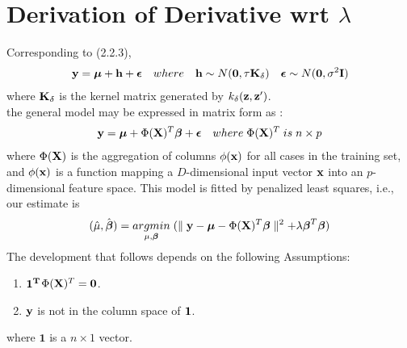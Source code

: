 \documentclass[11pt]{article}
\begin{document}
\section{{\bf Derivation of Derivative wrt $\lambda$}}
Corresponding to (2.2.3),
\begin{align*}
{\bf y}=\boldsymbol{\mu}+{\bf h}+\boldsymbol{\epsilon} \quad where \quad {\bf h} \sim N(\mathbf{0}, \tau {\bf K}_\delta) \quad \boldsymbol{\epsilon} \sim N(\mathbf{0}, \sigma^2{\bf I})
\end{align*}
where ${\bf K}_\delta$ is the kernel matrix generated by $k_{\delta}({\bf z}, {\bf z}')$.\\
the general model may be expressed in matrix form as \citep{reiss_smoothing_2009}:
\begin{align}
{\bf y}=\boldsymbol{\mu}+\Phi({\bf X})^T \boldsymbol{\beta}+\boldsymbol{\epsilon} \quad where\; \Phi({\bf X})^T \;is\; n\times p
\end{align}
where $\Phi({\bf X})$ is the aggregation of columns $\phi({\bf x})$ for all cases in the training set, and $\phi({\bf x})$ is a function mapping a $D$-dimensional input vector ${\bf x}$ into an $p$-dimensional feature space. This model is fitted by penalized least squares, i.e., our estimate is
\begin{align}
(\hat{\mu}, \hat{\boldsymbol{\beta}})=\underset{\mu, \boldsymbol{\beta}}{argmin} \; (\parallel {\bf y}-\boldsymbol{\mu}-\Phi({\bf X})^T \boldsymbol{\beta} \parallel^2+\lambda \boldsymbol{\beta}^T\boldsymbol{\beta})
\end{align}
The development that follows depends on the following Assumptions:
\begin{enumerate}[1.]
\item $\bf{1}^T$$\Phi({\bf X})^T=\mathbf{0}$.
\item ${\bf y}$ is not in the column space of $\bf{1}$.
\end{enumerate}
where $\mathbf{1}$ is a $n\times 1$ vector.
\end{document}

